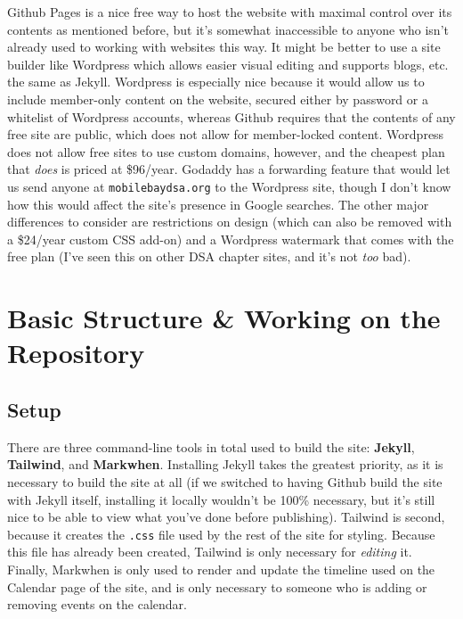 \documentclass[
]{book}
\begin{document}
Github Pages is a nice free way to host the website with maximal control over its contents as mentioned before, but it's somewhat inaccessible to anyone who isn't already used to working with websites this way. It might be better to use a site builder like Wordpress which allows easier visual editing and supports blogs, etc. the same as Jekyll. Wordpress is especially nice because it would allow us to include member-only content on the website, secured either by password or a whitelist of Wordpress accounts, whereas Github requires that the contents of any free site are public, which does not allow for member-locked content. Wordpress does not allow free sites to use custom domains, however, and the cheapest plan that \emph{does} is priced at \$96/year. Godaddy has a forwarding feature that would let us send anyone at \texttt{mobilebaydsa.org} to the Wordpress site, though I don't know how this would affect the site's presence in Google searches. The other major differences to consider are restrictions on design (which can also be removed with a \$24/year custom CSS add-on) and a Wordpress watermark that comes with the free plan (I've seen this on other DSA chapter sites, and it's not \emph{too} bad).

\part{Basic Structure \& Working on the Repository}\label{part-basic-structure-working-on-the-repository}

\chapter{Setup}\label{setup}

There are three command-line tools in total used to build the site: \textbf{Jekyll}, \textbf{Tailwind}, and \textbf{Markwhen}. Installing Jekyll takes the greatest priority, as it is necessary to build the site at all (if we switched to having Github build the site with Jekyll itself, installing it locally wouldn't be 100\% necessary, but it's still nice to be able to view what you've done before publishing). Tailwind is second, because it creates the \texttt{.css} file used by the rest of the site for styling. Because this file has already been created, Tailwind is only necessary for \emph{editing} it. Finally, Markwhen is only used to render and update the timeline used on the Calendar page of the site, and is only necessary to someone who is adding or removing events on the calendar.
\end{document}
